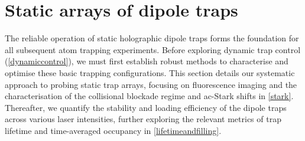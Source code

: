 \documentclass[../Thesis-IJspeert.tex]{subfiles}
\begin{document}
\section{Static arrays of dipole traps}
The reliable operation of static holographic dipole traps forms the foundation for all subsequent atom trapping experiments. Before exploring dynamic trap control (\autoref{dynamiccontrol}), we must first establish robust methods to characterise and optimise these basic trapping configurations. This section details our systematic approach to probing static trap arrays, focusing on fluorescence imaging and the characterisation of the collisional blockade regime and ac-Stark shifts in \autoref{stark}. Thereafter, we quantify the stability and loading efficiency of the dipole traps across various laser intensities, further exploring the relevant metrics of trap lifetime and time-averaged occupancy in \autoref{lifetimeandfilling}.
\end{document}
